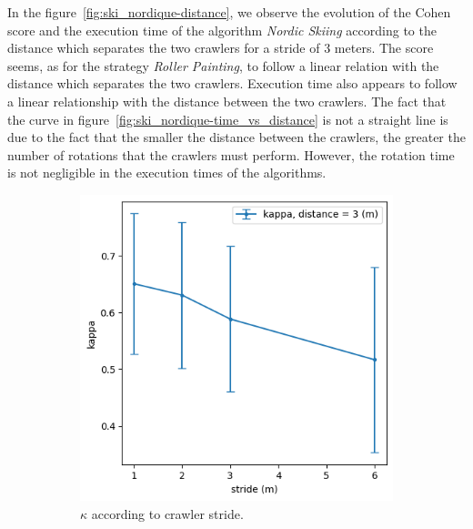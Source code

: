 In the figure~\ref{fig:ski_nordique-distance}, we observe the evolution of the Cohen score and the execution time of the algorithm \textit{Nordic Skiing} according to the distance which separates the two crawlers for a stride of 3 meters.
The score seems, as for the strategy \textit{Roller Painting}, to follow a linear relation with the distance which separates the two crawlers.
Execution time also appears to follow a linear relationship with the distance between the two crawlers.
The fact that the curve in figure~\ref{fig:ski_nordique-time_vs_distance} is not a straight line is due to the fact that the smaller the distance between the crawlers, the greater the number of rotations that the crawlers must perform.
However, the rotation time is not negligible in the execution times of the algorithms.

\begin{figure}[h!]
	\begin{subfigure}[t]{0.49\linewidth}
		\includegraphics[width=\linewidth]{graphics/ski_nordique-kappa_vs_stride.png}
		\caption{$\kappa$ according to crawler stride.}
		\label{fig:ski_nordique-kappa_vs_stride}
	\end{subfigure}
	\hfill
	\begin{subfigure}[t]{0.49\linewidth}

\end{subfigure}
\end{figure}

